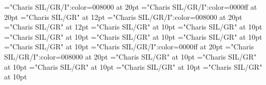\documentclass[a4paper]{article}
\begin{document}
\pagestyle{plain}
\sloppy
\setlength{\parfillskip}{0pt plus 1fil}
\font\pronunciationenUSpronunciationarticlebefore="Charis SIL/GR/I":color=008000 at 20pt
\font\pronunciationenUKpronunciationenUSbefore="Charis SIL/GR/I":color=0000ff at 20pt
\font\pronunciationenUSfirstoftypebefore="Charis SIL/GR" at 12pt
\font\pronunciationenUSpronunciationbefore="Charis SIL/GR/I":color=008000 at 20pt
\font\pronunciationenUSbefore="Charis SIL/GR" at 12pt
\font\sectionletterdictionary="Charis SIL/GR" at 10pt
\font\headsectionletterdictionary="Charis SIL/GR" at 10pt
\font\articledictionary="Charis SIL/GR" at 10pt
\font\headwordfirstoftypearticledictionary="Charis SIL/GR" at 10pt
\font\grammarrequiresfirstoftypearticledictionary="Charis SIL/GR" at 10pt
\font\relationsynonymfirstoftypearticledictionary="Charis SIL/GR" at 10pt
\font\pronunciationenUKarticledictionary="Charis SIL/GR/I":color=0000ff at 20pt
\font\pronunciationenUSarticledictionary="Charis SIL/GR/I":color=008000 at 20pt
\font\grammarcategoryfirstoftypearticledictionary="Charis SIL/GR" at 10pt
\font{}="Charis SIL/GR" at 10pt
\font\notefirstoftypearticledictionary="Charis SIL/GR" at 10pt
\font\exampleusearticledictionary="Charis SIL/GR" at 10pt
\font\examplearticledictionary="Charis SIL/GR" at 10pt

\mbox{} 
\newpage 
\newpage 
\setcounter{page}{1} 
\pagestyle{fancy} 


\end{document}
